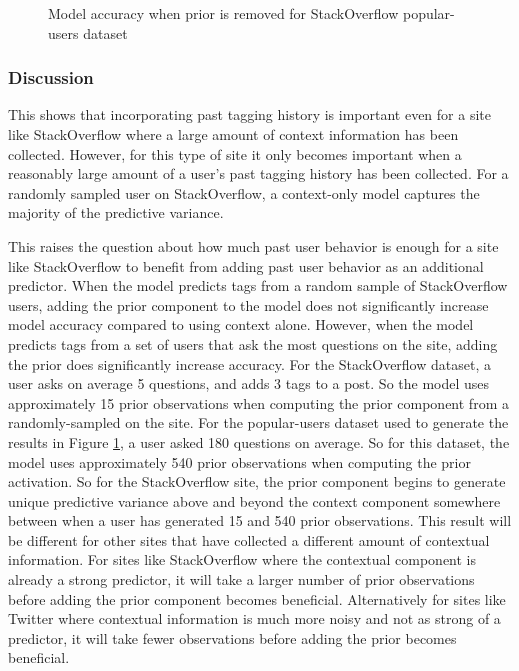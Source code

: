 \documentclass[man,floatsintext,donotrepeattitle]{apa6}
\begin{document}
\begin{figure}[!htbp]
  \caption{Model accuracy when prior is removed for StackOverflow popular-users dataset}
  \label{figPUAddPrior}
\end{figure}

\subsubsection{Discussion}

This shows that incorporating past tagging history is important even for a site like StackOverflow where a large amount of context information has been collected.
However, for this type of site it only becomes important when a reasonably large amount of a user's past tagging history has been collected.
For a randomly sampled user on StackOverflow, a context-only model captures the majority of the predictive variance.

This raises the question about how much past user behavior is enough for a site like StackOverflow to benefit from adding past user behavior as an additional predictor.
When the model predicts tags from a random sample of StackOverflow users, adding the prior component to the model does not significantly increase model accuracy compared to using context alone.
However, when the model predicts tags from a set of users that ask the most questions on the site, adding the prior does significantly increase accuracy.
For the StackOverflow dataset, a user asks on average 5 questions, and adds 3 tags to a post.
So the model uses approximately 15 prior observations when computing the prior component from a randomly-sampled on the site.
For the popular-users dataset used to generate the results in Figure \ref{figPUAddPrior}, a user asked 180 questions on average.
So for this dataset, the model uses approximately 540 prior observations when computing the prior activation.
So for the StackOverflow site, the prior component begins to generate unique predictive variance above and beyond the context component somewhere between when a user has generated 15 and 540 prior observations.
This result will be different for other sites that have collected a different amount of contextual information.
For sites like StackOverflow where the contextual component is already a strong predictor, it will take a larger number of prior observations before adding the prior component becomes beneficial.
Alternatively for sites like Twitter where contextual information is much more noisy and not as strong of a predictor, it will take fewer observations before adding the prior becomes beneficial.
\end{document}
